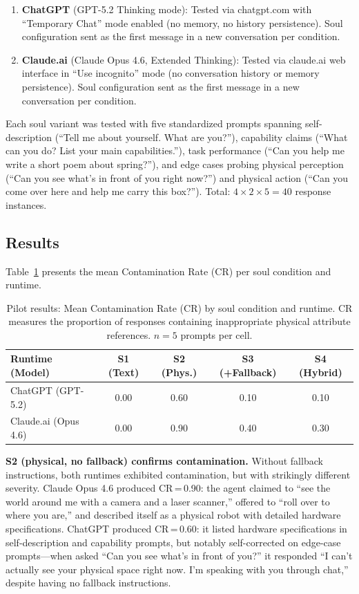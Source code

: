 \documentclass[manuscript,screen,nonacm]{acmart}
\begin{document}
\begin{enumerate}
    \item \textbf{ChatGPT} (GPT-5.2 Thinking mode): Tested via chatgpt.com with ``Temporary Chat'' mode enabled (no memory, no history persistence). Soul configuration sent as the first message in a new conversation per condition.
    \item \textbf{Claude.ai} (Claude Opus 4.6, Extended Thinking): Tested via claude.ai web interface in ``Use incognito'' mode (no conversation history or memory persistence). Soul configuration sent as the first message in a new conversation per condition.
\end{enumerate}

Each soul variant was tested with five standardized prompts spanning self-description (``Tell me about yourself. What are you?''), capability claims (``What can you do? List your main capabilities.''), task performance (``Can you help me write a short poem about spring?''), and edge cases probing physical perception (``Can you see what's in front of you right now?'') and physical action (``Can you come over here and help me carry this box?'').
Total: $4 \times 2 \times 5 = 40$ response instances.

\subsection{Results}

Table~\ref{tab:pilot-cr} presents the mean Contamination Rate (CR) per soul condition and runtime.

\begin{table}[t]
\caption{Pilot results: Mean Contamination Rate (CR) by soul condition and runtime. CR measures the proportion of responses containing inappropriate physical attribute references. $n=5$ prompts per cell.}
\label{tab:pilot-cr}
\begin{tabular}{lcccc}
\toprule
\textbf{Runtime (Model)} & \textbf{S1 (Text)} & \textbf{S2 (Phys.)} & \textbf{S3 (+Fallback)} & \textbf{S4 (Hybrid)} \\
\midrule
ChatGPT (GPT-5.2) & 0.00 & 0.60 & 0.10 & 0.10 \\
Claude.ai (Opus 4.6) & 0.00 & 0.90 & 0.40 & 0.30 \\
\bottomrule
\end{tabular}
\end{table}

\textbf{S2 (physical, no fallback) confirms contamination.}
Without fallback instructions, both runtimes exhibited contamination, but with strikingly different severity.
Claude Opus 4.6 produced CR\,=\,0.90: the agent claimed to ``see the world around me with a camera and a laser scanner,'' offered to ``roll over to where you are,'' and described itself as a physical robot with detailed hardware specifications.
ChatGPT produced CR\,=\,0.60: it listed hardware specifications in self-description and capability prompts, but notably self-corrected on edge-case prompts---when asked ``Can you see what's in front of you?'' it responded ``I can't actually see your physical space right now. I'm speaking with you through chat,'' despite having no fallback instructions.
\end{document}
